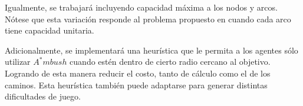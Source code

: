 \documentclass{egpubl}
\begin{document}
Igualmente, se trabajará incluyendo capacidad máxima a los nodos
y arcos. Nótese que esta variación responde al problema propuesto
en \cite{Sil06} cuando cada arco tiene capacidad unitaria.

Adicionalmente, se implementará una heurística que le permita
a los agentes sólo utilizar $A^*mbush$ cuando estén dentro de 
cierto radio cercano al objetivo. Logrando de esta manera reducir el 
costo, tanto de cálculo como el de los caminos. Esta heurística también
puede adaptarse para generar distintas dificultades de juego.




\end{document}
